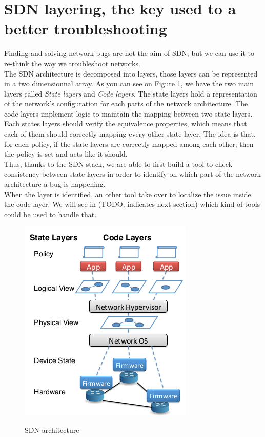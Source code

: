 \documentclass[10pt,article]{IEEEtran}
\begin{document}
\section{SDN layering, the key used to a better troubleshooting}
Finding and solving network bugs are not the aim of SDN, but we can use it to re-think the way we troubleshoot networks.\\ The SDN architecture is decomposed into  layers, those layers can be represented in a two dimensionnal array. As you can see on Figure \ref{layers}, we have the two main layers called \textit{State layers} and \textit{Code layers}. The state layers hold a representation of the network's configuration for each parts of the network architecture. The code layers implement logic to maintain the mapping between two state layers. Each states layers should verify the equivalence properties, which means that each of them should correctly mapping every other state layer. The idea is that, for each policy, if the state layers are correctly mapped among each other, then the policy is  set and acts like it should.\\
Thus, thanks to the SDN stack, we are able to first build a tool to check consistency between state layers in order to identify on which part of the network architecture a bug is happening. \\
When the layer is identified, an other tool take over to localize the issue inside the code layer. We will see in (TODO: indicates next section) which kind of tools could be used to handle that.
\begin{figure}
\includegraphics[scale=0.65]{layers.png}
\label{layers}
\caption{SDN architecture}
\end{figure}
\end{document}
